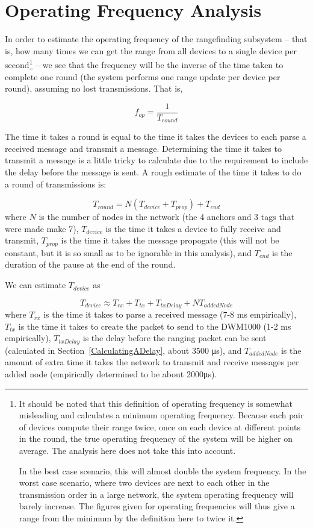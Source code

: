\chapter{Operating Frequency Analysis}
\label{OperatingFrequencyAnalysis}

In order to estimate the operating frequency of the rangefinding subsystem -- that is, how many times we can get the range from all devices to a single device per second\footnote{It should be noted that this definition of operating frequency is somewhat misleading and calculates a minimum operating frequency. Because each pair of devices compute their range twice, once on each device at different points in the round, the true operating frequency of the system will be higher on average. The analysis here does not take this into account. 

In the best case scenario, this will almost double the system frequency. In the worst case scenario, where two devices are next to each other in the transmission order in a large network, the system operating frequency will barely increase. The figures given for operating frequencies will thus give a range from the minimum by the definition here to twice it.} -- we see that the frequency will be the inverse of the time taken to complete one round (the system performs one range update per device per round), assuming no lost transmissions. That is,

\[
 	f_{op} = \frac{1}{T_{round}}
\]

The time it takes a round is equal to the time it takes the devices to each parse a received message and transmit a message. Determining the time it takes to transmit a message is a little tricky to calculate due to the requirement to include the delay before the message is sent. A rough estimate of the time it takes to do a round of transmissions is:

\[
	T_{round} =  N(T_{device} + T_{prop}) + T_{end}
\]
where $N$ is the number of nodes in the network (the 4 anchors and 3 tags that were made make 7), $T_{device}$ is the time it takes a device to fully receive and transmit, $T_{prop}$ is the time it takes the message propogate (this will not be constant, but it is so small as to be ignorable in this analysis), and $T_{end}$ is the duration of the pause at the end of the round. 

We can estimate $T_{device}$ as

\[
	T_{device} \approx T_{rx} + T_{tx} + T_{txDelay} + NT_{addedNode}
\]
where $T_{rx}$ is the time it takes to parse a received message (7-8 ms empirically), $T_{tx}$ is the time it takes to create the packet to send to the DWM1000 (1-2 ms empirically), $T_{txDelay}$ is the delay before the ranging packet can be sent (calculated in Section~\ref{CalculatingADelay}, about 3500 \si{\micro\second}), and $T_{addedNode}$ is the amount of extra time it takes the network to transmit and receive messages per added node (empirically determined to be about 2000\si{\micro\second}).

